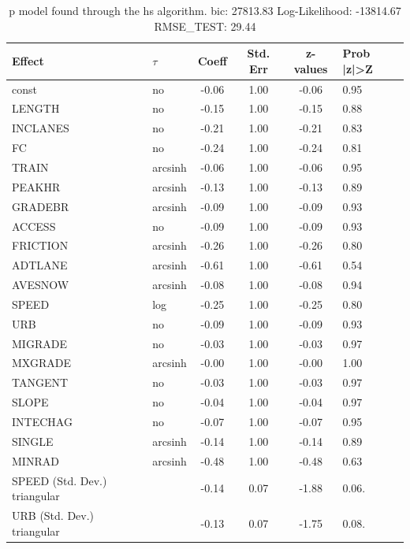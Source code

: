 \begin{table}
	\caption{p model found through the hs algorithm. bic: 27813.83 Log-Likelihood: -13814.67 RMSE_TEST: 29.44}
	\begin{center}
		\begin{tabular}{|l|l|c|c|c|l|}
			\hline
			Effect & $\tau$ & Coeff & Std. Err & z-values & Prob |z|>Z \\
			\hline
			const & no & -0.06 & 1.00 & -0.06 & 0.95 \\
			\hline
			LENGTH & no & -0.15 & 1.00 & -0.15 & 0.88 \\
			\hline
			INCLANES & no & -0.21 & 1.00 & -0.21 & 0.83 \\
			\hline
			FC & no & -0.24 & 1.00 & -0.24 & 0.81 \\
			\hline
			TRAIN & arcsinh & -0.06 & 1.00 & -0.06 & 0.95 \\
			\hline
			PEAKHR & arcsinh & -0.13 & 1.00 & -0.13 & 0.89 \\
			\hline
			GRADEBR & arcsinh & -0.09 & 1.00 & -0.09 & 0.93 \\
			\hline
			ACCESS & no & -0.09 & 1.00 & -0.09 & 0.93 \\
			\hline
			FRICTION & arcsinh & -0.26 & 1.00 & -0.26 & 0.80 \\
			\hline
			ADTLANE & arcsinh & -0.61 & 1.00 & -0.61 & 0.54 \\
			\hline
			AVESNOW & arcsinh & -0.08 & 1.00 & -0.08 & 0.94 \\
			\hline
			SPEED & log & -0.25 & 1.00 & -0.25 & 0.80 \\
			\hline
			URB & no & -0.09 & 1.00 & -0.09 & 0.93 \\
			\hline
			MIGRADE & no & -0.03 & 1.00 & -0.03 & 0.97 \\
			\hline
			MXGRADE & arcsinh & -0.00 & 1.00 & -0.00 & 1.00 \\
			\hline
			TANGENT & no & -0.03 & 1.00 & -0.03 & 0.97 \\
			\hline
			SLOPE & no & -0.04 & 1.00 & -0.04 & 0.97 \\
			\hline
			INTECHAG & no & -0.07 & 1.00 & -0.07 & 0.95 \\
			\hline
			SINGLE & arcsinh & -0.14 & 1.00 & -0.14 & 0.89 \\
			\hline
			MINRAD & arcsinh & -0.48 & 1.00 & -0.48 & 0.63 \\
			\hline
			SPEED (Std. Dev.) triangular &  & -0.14 & 0.07 & -1.88 & 0.06. \\
			\hline
			URB (Std. Dev.) triangular &  & -0.13 & 0.07 & -1.75 & 0.08. \\

\end{tabular}
\end{center}
\end{table}
